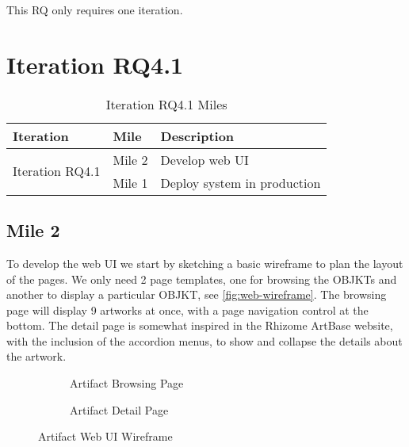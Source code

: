This RQ only requires one iteration.

\section {Iteration RQ4.1}

\begin{table}[H]
\footnotesize
\centering
\begin{tabular}{|l|c|l|}
\hline
\textbf{Iteration}        & \multicolumn{1}{l|}{\textbf{Mile}} & \textbf{Description}                                         \\ \hline
\multirow{2}{*}{Iteration RQ4.1} & Mile 2                              & Develop web UI                   \\ \cline{2-3} 
                             & Mile 1                              & Deploy system in production \\ \hline
\end{tabular}
\caption{Iteration RQ4.1 Miles}
\end{table}

\subsection {Mile 2}

To develop the web UI we start by sketching a basic wireframe to plan the layout of the pages. We only need 2 page templates, one for browsing the OBJKTs and another to display a particular OBJKT, see \autoref{fig:web-wireframe}.
The browsing page will display 9 artworks at once, with a page navigation control at the bottom.
The detail page is somewhat inspired in the Rhizome ArtBase website, with the inclusion of the accordion menus, to show and collapse the details about the artwork.

\begin{figure}[H]
  \centering
  \begingroup
  \setlength{\fboxsep}{0pt} %
  \setlength{\fboxrule}{1pt} %
  \begin{subfigure}[b]{0.45\textwidth}
    \centering
    \caption{Artifact Browsing Page}
    \label{fig:wireframe1}
  \end{subfigure}
  \hfill
  \begin{subfigure}[b]{0.45\textwidth}
    \centering
    \caption{Artifact Detail Page}
    \label{fig:wireframe2}
  \end{subfigure}
  \endgroup
  \caption{Artifact Web UI Wireframe}
  \label{fig:web-wireframe}
\end{figure}

